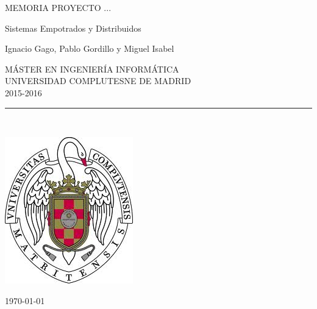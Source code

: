 \begin{center}

   \vspace{1cm}


   {\Large MEMORIA PROYECTO ...}\\

   \vspace{0.5cm}

   {\Large Sistemas Empotrados y Distribuidos }\\

   \vspace{0.5cm}




   {\large Ignacio Gago, Pablo Gordillo y Miguel Isabel}\\

   \vspace{0.5cm}




   M\'ASTER EN INGENIER\'IA INFORM\'ATICA\\
   UNIVERSIDAD COMPLUTESNE DE MADRID \\
   2015-2016\\


   \vspace{0.65cm}
   \rule{2in}{0.5pt}\\
   \vspace{0.85cm}

  \includegraphics[height=2.5in]{escudo.jpg}
  

   \vspace{0.5cm}


   \vspace{0.5cm}






   \today \\
   \vspace{1cm}

\end{center}


